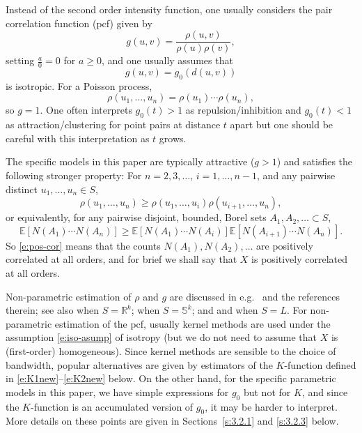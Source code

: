 \documentclass[alpha-refs]{wiley-article}
\begin{document}
Instead of the second order intensity function, one usually considers the pair correlation function (pcf) given by
\[g(u,v)=\frac{\rho(u,v)}{\rho(u)\rho(v)},\]
 setting $\frac{a}{0}=0$ for $a\ge0$, and one usually assumes that
 \begin{equation}\label{e:iso-asump}
 g(u,v)=g_0(d(u,v))
 \end{equation}
 is isotropic. For a Poisson process, 
 \begin{equation}\label{e:Poisson-rho-n}
 \rho(u_1,\ldots,u_n)=\rho(u_1)\cdots\rho(u_n),
 \end{equation}
  so $g=1$. One often interprets $g_0(t)>1$ as repulsion/inhibition and $g_0(t)<1$ as attraction/clustering for point pairs at distance $t$ apart but one should be careful with this interpretation as $t$ grows. %

The specific models in this paper are typically attractive ($g>1$) and satisfies the following stronger property: For $n=2,3,\ldots$, $i=1,\ldots,n-1$, and any pairwise distinct $u_1,\ldots,u_n\in S$,
\begin{equation}\label{e:pos-cor}
\rho(u_1,\ldots,u_n)\ge \rho(u_1,\ldots,u_i)\rho(u_{i+1},\ldots,u_n),
\end{equation}
or equivalently, for any pairwise disjoint, bounded, Borel sets $A_1,A_2,\ldots\subset S$, 
\[\mathbb E\left[N(A_1)\cdots N(A_n)\right]\ge \mathbb E\left[N(A_1)\cdots N(A_i)\right]\mathbb E\left[N(A_{i+1})\cdots N(A_n)\right].\]
So \eqref{e:pos-cor} means that the counts $N(A_1),N(A_2),\ldots$ are positively correlated at all orders, and for brief we shall say that $X$ is positively correlated at all orders.  

Non-parametric estimation of $\rho$ and $g$ are discussed in e.g.\ \citet{spatstat} and the references therein; see also \citet{ShawEtAl} when $S=\mathbb R^k$; \citet{LawrenceEtAl} when $S=\mathbb S^k$; and \citet{RakshitEtAl} and \citet{RakshitEtAl19} when $S=L$. 
For non-parametric estimation of the pcf, usually
kernel methods are used under the assumption \eqref{e:iso-asump} of isotropy (but we do not need to assume that $X$ is (first-order) homogeneous).  
Since kernel methods are sensible to the choice of bandwidth, 
popular alternatives  are given by 
estimators %
of the $K$-function %
defined in 
 \eqref{e:K1new}--\eqref{e:K2new} below. On the other hand, for the specific parametric models in this paper, we have simple expressions for $g_0$ but not for $K$,
 and
 since the $K$-function is an accumulated version of $g_0$, it may be harder to interpret.
 More details on these points are given in Sections~\ref{s:3.2.1} and \ref{s:3.2.3} below.
 
\end{document}
